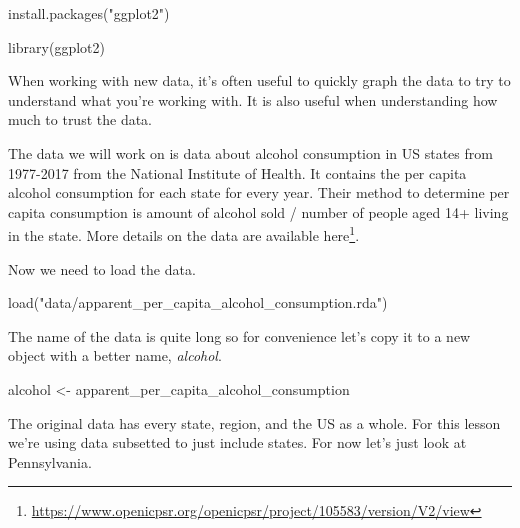 \documentclass[
]{krantz}
\makeatletter
\newenvironment{Shaded}{\begin{snugshade}}{\end{snugshade}}
\newcommand{\FunctionTok}[1]{\textcolor[rgb]{0,0,0}{#1}}
\newcommand{\NormalTok}[1]{#1}
\newcommand{\OtherTok}[1]{\textcolor[rgb]{0.37,0.37,0.37}{#1}}
\newcommand{\SpecialCharTok}[1]{\textcolor[rgb]{0,0,0}{#1}}
\newcommand{\StringTok}[1]{\textcolor[rgb]{0.5,0.5,0.5}{#1}}
\renewcommand{\href}[2]{#2\footnote{\url{#1}}}
\newenvironment{kframe}{%
\medskip{}
\setlength{\fboxsep}{.8em}
 \def\at@end@of@kframe{}%
 \ifinner\ifhmode%
  \def\at@end@of@kframe{\end{minipage}}%
  \begin{minipage}{\columnwidth}%
 \fi\fi%
 \def\FrameCommand##1{\hskip\@totalleftmargin \hskip-\fboxsep
 \colorbox{shadecolor}{##1}\hskip-\fboxsep
     \hskip-\linewidth \hskip-\@totalleftmargin \hskip\columnwidth}%
 \MakeFramed {\advance\hsize-\width
   \@totalleftmargin\z@ \linewidth\hsize
   \@setminipage}}%
 {\par\unskip\endMakeFramed%
 \at@end@of@kframe}
\renewenvironment{Shaded}{\begin{kframe}}{\end{kframe}}
\makeatother
\begin{document}
\begin{Shaded}
\begin{Highlighting}[]
\FunctionTok{install.packages}\NormalTok{(}\StringTok{"ggplot2"}\NormalTok{)}
\end{Highlighting}
\end{Shaded}

\begin{Shaded}
\begin{Highlighting}[]
\FunctionTok{library}\NormalTok{(ggplot2)}
\end{Highlighting}
\end{Shaded}

When working with new data, it's often useful to quickly
graph the data to try to understand what you're working
with. It is also useful when understanding how much to trust
the data.

The data we will work on is data about alcohol consumption
in US states from 1977-2017 from the National Institute of
Health. It contains the per capita alcohol consumption for
each state for every year. Their method to determine per
capita consumption is amount of alcohol sold / number of
people aged 14+ living in the state. More details on the
data are available
\href{https://www.openicpsr.org/openicpsr/project/105583/version/V2/view}{here}.

Now we need to load the data.

\begin{Shaded}
\begin{Highlighting}[]
\FunctionTok{load}\NormalTok{(}\StringTok{"data/apparent\_per\_capita\_alcohol\_consumption.rda"}\NormalTok{)}
\end{Highlighting}
\end{Shaded}

The name of the data is quite long so for convenience let's
copy it to a new object with a better name, \emph{alcohol}.

\begin{Shaded}
\begin{Highlighting}[]
\NormalTok{alcohol }\OtherTok{\textless{}{-}}\NormalTok{ apparent\_per\_capita\_alcohol\_consumption}
\end{Highlighting}
\end{Shaded}

The original data has every state, region, and the US as a
whole. For this lesson we're using data subsetted to just
include states. For now let's just look at Pennsylvania.

\begin{Shaded}
\end{Shaded}
\end{document}
